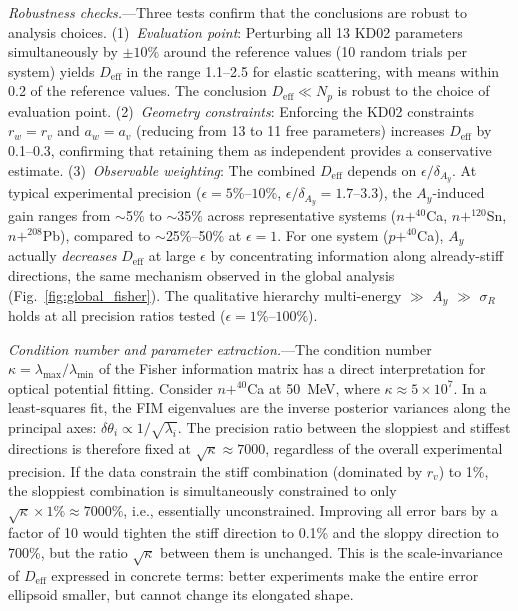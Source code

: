 \documentclass[aps,prl,reprint,superscriptaddress,showpacs]{revtex4-2}
\begin{document}
\textit{Robustness checks.}---Three tests confirm that the conclusions are robust to analysis choices. (1)~\emph{Evaluation point}: Perturbing all 13 KD02 parameters simultaneously by $\pm 10\%$ around the reference values (10 random trials per system) yields $D_\mathrm{eff}$ in the range 1.1--2.5 for elastic scattering, with means within 0.2 of the reference values. The conclusion $D_\mathrm{eff} \ll N_p$ is robust to the choice of evaluation point. (2)~\emph{Geometry constraints}: Enforcing the KD02 constraints $r_w = r_v$ and $a_w = a_v$ (reducing from 13 to 11 free parameters) increases $D_\mathrm{eff}$ by 0.1--0.3, confirming that retaining them as independent provides a conservative estimate. (3)~\emph{Observable weighting}: The combined $D_\mathrm{eff}$ depends on $\epsilon / \delta_{A_y}$. At typical experimental precision ($\epsilon = 5\%$--$10\%$, $\epsilon/\delta_{A_y} = 1.7$--$3.3$), the $A_y$-induced gain ranges from $\sim$5\% to $\sim$35\% across representative systems ($n+^{40}$Ca, $n+^{120}$Sn, $n+^{208}$Pb), compared to $\sim$25\%--50\% at $\epsilon = 1$. For one system ($p+^{40}$Ca), $A_y$ actually \emph{decreases} $D_\mathrm{eff}$ at large $\epsilon$ by concentrating information along already-stiff directions, the same mechanism observed in the global analysis (Fig.~\ref{fig:global_fisher}). The qualitative hierarchy multi-energy $\gg$ $A_y$ $\gg$ $\sigma_R$ holds at all precision ratios tested ($\epsilon = 1\%$--$100\%$).

\textit{Condition number and parameter extraction.}---The condition number $\kappa = \lambda_\mathrm{max}/\lambda_\mathrm{min}$ of the Fisher information matrix has a direct interpretation for optical potential fitting. Consider $n+^{40}$Ca at 50~MeV, where $\kappa \approx 5 \times 10^7$. In a least-squares fit, the FIM eigenvalues are the inverse posterior variances along the principal axes: $\delta\theta_i \propto 1/\sqrt{\lambda_i}$. The precision ratio between the sloppiest and stiffest directions is therefore fixed at $\sqrt{\kappa} \approx 7000$, regardless of the overall experimental precision. If the data constrain the stiff combination (dominated by $r_v$) to 1\%, the sloppiest combination is simultaneously constrained to only $\sqrt{\kappa} \times 1\% \approx 7000\%$, i.e., essentially unconstrained. Improving all error bars by a factor of 10 would tighten the stiff direction to 0.1\% and the sloppy direction to 700\%, but the ratio $\sqrt{\kappa}$ between them is unchanged. This is the scale-invariance of $D_\mathrm{eff}$ expressed in concrete terms: better experiments make the entire error ellipsoid smaller, but cannot change its elongated shape.
\end{document}

